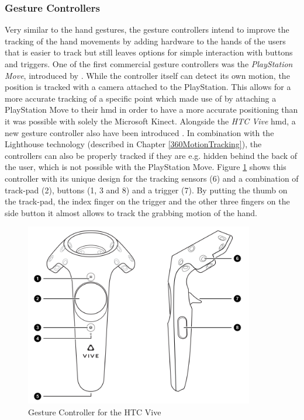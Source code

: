 \subsubsection{Gesture Controllers}

\label{SubSubSectionGestureControllers}

Very similar to the hand gestures, the gesture controllers intend to improve the tracking of the hand movements by adding hardware to the hands of the users that is easier to track but still leaves options for simple interaction with buttons and triggers. \newline
One of the first commercial gesture controllers was the \textit{PlayStation Move}, introduced by \cite{Sony2010}. While the controller itself can detect its own motion, the position is tracked with a camera attached to the PlayStation. This allows for a more accurate tracking of a specific point which \cite{Takala2014} made use of by attaching a PlayStation Move to their \gls{hmd} in order to have a more accurate positioning than it was possible with solely the Microsoft Kinect. \newline
Alongside the \textit{HTC Vive} \gls{hmd}, a new gesture controller also have been introduced \citep{Htcvive2016}. In combination with the Lighthouse technology (described in Chapter \ref{360MotionTracking}), the controllers can also be properly tracked if they are e.g. hidden behind the back of the user, which is not possible with the PlayStation Move. Figure \ref{fig:gesturecontroller} shows this controller with its unique design for the tracking sensors (6) and a combination of track-pad (2), buttons (1, 3 and 8) and a trigger (7). By putting the thumb on the track-pad, the index finger on the trigger and the other three fingers on the side button it almost allows to track the grabbing motion of the hand.
\begin{figure}[h]
	\begin{center}
		\includegraphics[width=10cm]{03_Figures/05_LitReview/HTCCorp2016_GestureController.png}
		\caption[Gesture Controller for the HTC Vive]{Gesture Controller for the HTC Vive \citep{HTCCorp2016}}
		\label{fig:gesturecontroller}
	\end{center}
\end{figure}


